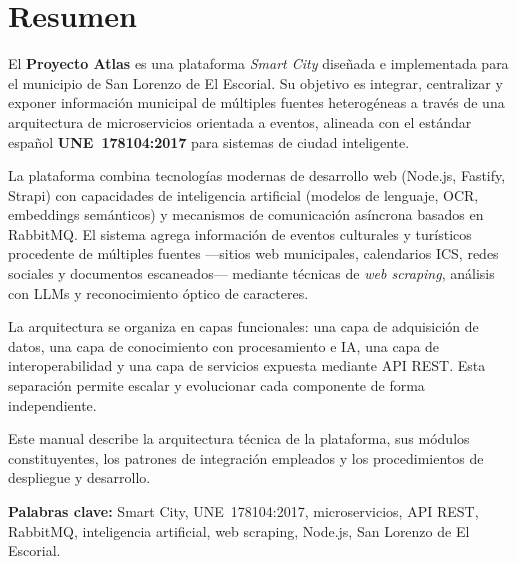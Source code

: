 \chapter*{Resumen}

El \textbf{Proyecto Atlas} es una plataforma \textit{Smart City} diseñada e implementada para el municipio de San Lorenzo de El Escorial. Su objetivo es integrar, centralizar y exponer información municipal de múltiples fuentes heterogéneas a través de una arquitectura de microservicios orientada a eventos, alineada con el estándar español \textbf{UNE~178104:2017} para sistemas de ciudad inteligente.

La plataforma combina tecnologías modernas de desarrollo web (Node.js, Fastify, Strapi) con capacidades de inteligencia artificial (modelos de lenguaje, OCR, embeddings semánticos) y mecanismos de comunicación asíncrona basados en RabbitMQ. El sistema agrega información de eventos culturales y turísticos procedente de múltiples fuentes —sitios web municipales, calendarios ICS, redes sociales y documentos escaneados— mediante técnicas de \textit{web scraping}, análisis con LLMs y reconocimiento óptico de caracteres.

La arquitectura se organiza en capas funcionales: una capa de adquisición de datos, una capa de conocimiento con procesamiento e IA, una capa de interoperabilidad y una capa de servicios expuesta mediante API REST. Esta separación permite escalar y evolucionar cada componente de forma independiente.

Este manual describe la arquitectura técnica de la plataforma, sus módulos constituyentes, los patrones de integración empleados y los procedimientos de despliegue y desarrollo.

\vspace{1cm}
\textbf{Palabras clave:} Smart City, UNE~178104:2017, microservicios, API REST, RabbitMQ, inteligencia artificial, web scraping, Node.js, San Lorenzo de El Escorial.
